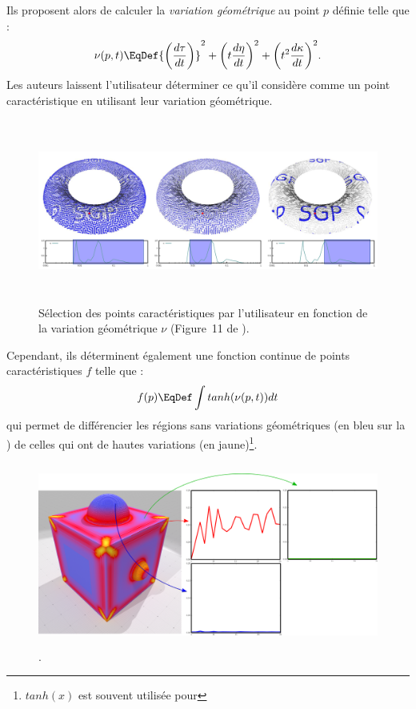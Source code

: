 %
Ils proposent alors de calculer la \emph{variation géométrique} au point $p$
définie telle que :
%
\begin{equation}
  \nu(p,t) \EqDef
  {\left(
    \frac{d\tau}{dt} \right)}^2
    + {\left( t\frac{d\eta}{dt}
  \right)}^2
  + {\left( t^2\frac{d\kappa}{dt} \right)}^2.
\end{equation}
%
Les auteurs laissent l'utilisateur déterminer ce qu'il considère comme un point
caractéristique en utilisant leur variation géométrique.
%
\begin{figure}[ht]{
    \begin{center}
    \includegraphics[height=6cm]{images/Feature/Mellado_multiscale}
    \end{center}}
    \caption[Sélection des points caractéristiques par l'utilisateur.]{Sélection des points caractéristiques par l'utilisateur en fonction de la variation géométrique $\nu$ (Figure~11 de \cite{Mellado2012}).
      \label{fig:mellado-multiscale}}
\end{figure}
%
Cependant, ils déterminent également une fonction continue de points
caractéristiques $f$ telle que :
%
\begin{equation}
   f(p) \EqDef \int tanh(\nu(p,t)) dt
\end{equation}
%
qui permet de différencier les régions sans variations géométriques (en bleu sur
la ) de celles qui ont de hautes variations
(en jaune)\footnote{$tanh(x)$ est souvent utilisée pour }.
%
\begin{figure}[ht]{
  \begin{center}
    \includegraphics[height=6cm]{figures/CubeSpherePlotMellado}
  \end{center}}
    \caption[.]{.
    \label{fig:mellado-cubesphere}}
\end{figure}
